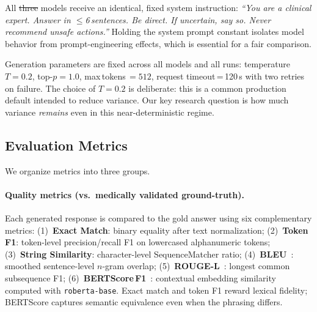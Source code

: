 \documentclass[11pt]{article}
\makeatletter
\providecommand{\DIFdeltex}[1]{{\protect\color{red}\sout{#1}}} %
\providecommand{\DIFdelbegin}{} %
\providecommand{\DIFdelend}{} %
\providecommand{\DIFdel}[1]{\texorpdfstring{\DIFdeltex{#1}}{}} %
\providecommand{\DIFscaledelfig}{0.5}
\newlength{\DIFdelgraphicswidth} %
\newlength{\DIFdelgraphicsheight} %
\providecommand{\DIFdelincludegraphics}[2][]{%
\sbox{\DIFdelgraphicsbox}{\DIFOincludegraphics[#1]{#2}}%
\settoboxwidth{\DIFdelgraphicswidth}{\DIFdelgraphicsbox} %
\settoboxtotalheight{\DIFdelgraphicsheight}{\DIFdelgraphicsbox} %
\scalebox{\DIFscaledelfig}{%
\parbox[b]{\DIFdelgraphicswidth}{\usebox{\DIFdelgraphicsbox}\\[-\baselineskip] \rule{\DIFdelgraphicswidth}{0em}}\llap{\resizebox{\DIFdelgraphicswidth}{\DIFdelgraphicsheight}{%
\setlength{\unitlength}{\DIFdelgraphicswidth}%
\begin{picture}(1,1)%
\thicklines\linethickness{2pt} %
{\color[rgb]{1,0,0}\put(0,0){\framebox(1,1){}}}%
{\color[rgb]{1,0,0}\put(0,0){\line( 1,1){1}}}%
{\color[rgb]{1,0,0}\put(0,1){\line(1,-1){1}}}%
\end{picture}%
}\hspace*{3pt}}} %
} %
\DeclareRobustCommand{\DIFdelbegin}{\DIFOdelbegin \let\includegraphics\DIFdelincludegraphics} %
\DeclareRobustCommand{\DIFdelend}{\DIFOaddend \let\includegraphics\DIFOincludegraphics} %
\let\sout@orig\sout %
\renewcommand{\sout}[1]{\ifmmode\text{\sout@orig{\ensuremath{#1}}}\else\sout@orig{#1}\fi} %
\makeatother
\begin{document}
All \DIFdelbegin \DIFdel{three }\DIFdelend models receive an identical, fixed system instruction:
\textit{``You are a clinical expert. Answer in $\leq$6\,sentences.
Be direct. If uncertain, say so. Never recommend unsafe actions.''}
Holding the system prompt constant isolates model behavior from
prompt-engineering effects, which is essential for a fair comparison.

Generation parameters are fixed across all models and all runs:
temperature $T{=}0.2$, top-$p{=}1.0$, max\,tokens\,$=512$,
request timeout\,=\,120\,s with two retries on failure.
The choice of $T{=}0.2$ is deliberate: this is a common production
default intended to reduce variance.
Our key research question is how much variance \emph{remains} even
in this near-deterministic regime.

\subsection{Evaluation Metrics}
\label{sec:metrics}

We organize metrics into three groups.

\paragraph{Quality metrics (vs.\ medically validated ground-truth).}
Each generated response is compared to the gold answer using six
complementary metrics:
(1)~\textbf{Exact Match}: binary equality after text normalization;
(2)~\textbf{Token F1}: token-level precision/recall F1 on
lowercased alphanumeric tokens;
(3)~\textbf{String Similarity}: character-level SequenceMatcher ratio;
(4)~\textbf{BLEU}~\cite{papineni2002bleu}: smoothed sentence-level
$n$-gram overlap;
(5)~\textbf{ROUGE-L}~\cite{lin2004rouge}: longest common subsequence F1;
(6)~\textbf{BERTScore\,F1}~\cite{zhang2020bertscore}: contextual
embedding similarity computed with \texttt{roberta-base}.
Exact match and token F1 reward lexical fidelity;
BERTScore captures semantic equivalence even when the phrasing differs.
\end{document}
